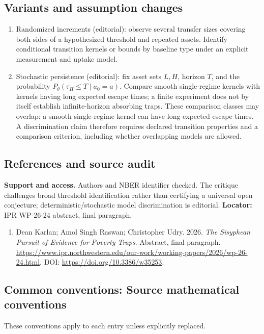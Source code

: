 \documentclass[11pt,a4paper]{article}
\begin{document}
\subsection*{Variants and assumption changes}
\begin{enumerate}
\item Randomized increments (editorial): observe several transfer sizes covering both sides of a hypothesized threshold and repeated assets. Identify conditional transition kernels or bounds by baseline type under an explicit measurement and uptake model.
\item Stochastic persistence (editorial): fix asset sets \(L,H\), horizon \(T\), and the probability \(P_\theta(\tau_H\le T\mid a_0=a)\). Compare smooth single-regime kernels with kernels having long expected escape times; a finite experiment does not by itself establish infinite-horizon absorbing traps. These comparison classes may overlap: a smooth single-regime kernel can have long expected escape times. A discrimination claim therefore requires declared transition properties and a comparison criterion, including whether overlapping models are allowed.
\end{enumerate}
\subsection*{References and source audit}
\textbf{Support and access.} Authors and NBER identifier checked. The critique challenges broad threshold identification rather than certifying a universal open conjecture; deterministic/stochastic model discrimination is editorial. \textbf{Locator:} IPR WP-26-24 abstract, final paragraph.
\begin{enumerate}\raggedright
\item\hypertarget{definitions:source:30007652:1}{} Dean Karlan; Amol Singh Raswan; Christopher Udry. 2026. \emph{The Sisyphean Pursuit of Evidence for Poverty Traps}. Abstract, final paragraph.
\url{https://www.ipr.northwestern.edu/our-work/working-papers/2026/wp-26-24.html}.
DOI: \url{https://doi.org/10.3386/w35253}.
\end{enumerate}

\subsection*{Common conventions: Source mathematical conventions}

These conventions apply to each entry unless explicitly replaced.
\end{document}

